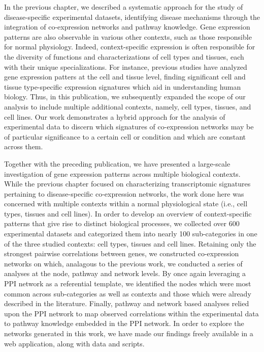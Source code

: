 \noindent
In the previous chapter, we described a systematic approach for the study of disease-specific experimental datasets, identifying disease mechanisms through the integration of co-expression networks and pathway knowledge. Gene expression patterns are also observable in various other contexts, such as those responsible for normal physiology. Indeed, context-specific expression is often responsible for the diversity of functions and characterizations of cell types and tissues, each with their unique specializations. For instance, previous studies \parencite{dobrin2009, pierson2015, mckenzie2018} have analyzed gene expression patters at the cell and tissue level, finding significant cell and tissue type-specific expression signatures which aid in understanding human biology. Thus, in this publication, we subsequently expanded the scope of our analysis to include multiple additional contexts, namely, cell types, tissues, and cell lines. Our work demonstrates a hybrid approach for the analysis of experimental data to discern which signatures of co-expression networks may be of particular significance to a certain cell or condition and which are constant across them.

Together with the preceding publication, we have presented a large-scale investigation of gene expression patterns across multiple biological contexts. While the previous chapter focused on characterizing transcriptomic signatures pertaining to disease-specific co-expression networks, the work done here was concerned with multiple contexts within a normal physiological state (i.e., cell types, tissues and cell lines). In order to develop an overview of context-specific patterns that give rise to distinct biological processes, we collected over 600 experimental datasets and categorized them into nearly 100 sub-categories in one of the three studied contexts: cell types, tissues and cell lines. Retaining only the strongest pairwise correlations between genes, we constructed co-expression networks on which, analagous to the previous work, we conducted a series of analyses at the node, pathway and network levels. By once again leveraging a PPI network as a referential template, we identified the nodes which were most common across sub-categories as well as contexts and those which were already described in the literature. Finally, pathway and network based analyses relied upon the PPI network to map observed correlations within the experimental data to pathway knowledge embedded in the PPI network. In order to explore the networks generated in this work, we have made our findings freely available in a web application, along with data and scripts. 
